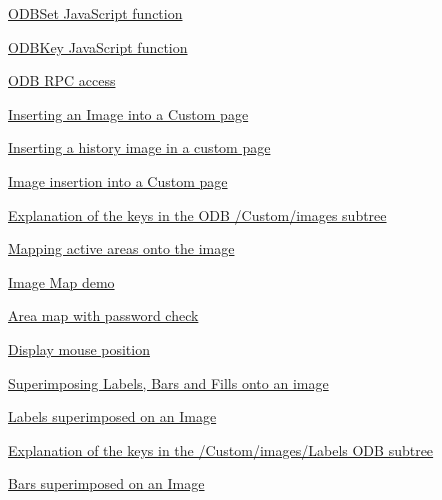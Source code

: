 \begin{TabularC}{2}
\begin{TabularC}{2}
\begin{DoxyItemize}
\begin{DoxyItemize}
\begin{DoxyItemize}
\begin{DoxyItemize}
\begin{DoxyItemize}
\begin{DoxyItemize}
\begin{DoxyItemize}
\begin{DoxyItemize}
\item \hyperlink{RC_mhttpd_custom_ODB_access_RC_mhttpd_custom_odbset}{ODBSet JavaScript function} 
\item \hyperlink{RC_mhttpd_custom_ODB_access_RC_mhttpd_custom_odbkey}{ODBKey JavaScript function} 
\end{DoxyItemize}
\end{DoxyItemize}
\end{DoxyItemize}
\item \hyperlink{RC_mhttpd_custom_RPC_access}{ODB RPC access} 
\item \hyperlink{RC_mhttpd_Image_access}{Inserting an Image into a Custom page} 
\begin{DoxyItemize}
\item \hyperlink{RC_mhttpd_Image_access_RC_mhttpd_custom_history}{Inserting a history image in a custom page} 
\item \hyperlink{RC_mhttpd_Image_access_RC_mhttpd_custom_image}{Image insertion into a Custom page} 
\begin{DoxyItemize}
\item \hyperlink{RC_mhttpd_Image_access_RC_mhttpd_custom_images_tree_keys}{Explanation of the keys in the ODB /Custom/images subtree} 
\end{DoxyItemize}
\item \hyperlink{RC_mhttpd_Image_access_RC_mhttpd_custom_imagemap}{Mapping active areas onto the image} 
\begin{DoxyItemize}
\item \hyperlink{RC_mhttpd_Image_access_RC_mhttpd_custom_imagemap_demo}{Image Map demo} 
\item \hyperlink{RC_mhttpd_Image_access_RC_mhttpd_custom_imagemap_pw}{Area map with password check} 
\end{DoxyItemize}
\item \hyperlink{RC_mhttpd_Image_access_RC_mhttpd_custom_getmouse}{Display mouse position} 
\item \hyperlink{RC_mhttpd_Image_access_RC_mhttpd_custom_Labels_Bars_Fills}{Superimposing Labels, Bars and Fills onto an image} 
\begin{DoxyItemize}
\item \hyperlink{RC_mhttpd_Image_access_RC_mhttpd_custom_labels}{Labels superimposed on an Image} 
\item \hyperlink{RC_mhttpd_Image_access_RC_mhttpd_labels_tree}{Explanation of the keys in the /Custom/images/Labels ODB subtree} 
\item \hyperlink{RC_mhttpd_Image_access_RC_mhttpd_custom_bars}{Bars superimposed on an Image} 

\end{DoxyItemize}
\end{DoxyItemize}
\end{DoxyItemize}
\end{DoxyItemize}
\end{DoxyItemize}
\end{DoxyItemize}
\end{DoxyItemize}
\end{TabularC}
\end{TabularC}
